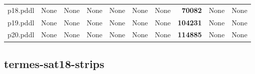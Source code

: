 \documentclass{article}
\begin{document}
\begin{tabular}{@{}lrrrrrrrrr@{}}
p18.pddl & \multicolumn{1}{|l|}{None} & \multicolumn{1}{|l|}{None} & \multicolumn{1}{|l|}{None} & \multicolumn{1}{|l|}{None} & \multicolumn{1}{|l|}{None} & \multicolumn{1}{|l|}{None} & \textbf{70082} & \multicolumn{1}{|l|}{None} & \multicolumn{1}{|l|}{None} \\
p19.pddl & \multicolumn{1}{|l|}{None} & \multicolumn{1}{|l|}{None} & \multicolumn{1}{|l|}{None} & \multicolumn{1}{|l|}{None} & \multicolumn{1}{|l|}{None} & \multicolumn{1}{|l|}{None} & \textbf{104231} & \multicolumn{1}{|l|}{None} & \multicolumn{1}{|l|}{None} \\
p20.pddl & \multicolumn{1}{|l|}{None} & \multicolumn{1}{|l|}{None} & \multicolumn{1}{|l|}{None} & \multicolumn{1}{|l|}{None} & \multicolumn{1}{|l|}{None} & \multicolumn{1}{|l|}{None} & \textbf{114885} & \multicolumn{1}{|l|}{None} & \multicolumn{1}{|l|}{None} \\
\end{tabular}

\hypertarget{operators-termes-sat18-strips}{}
\subsection*{termes-sat18-strips}
\end{document}
